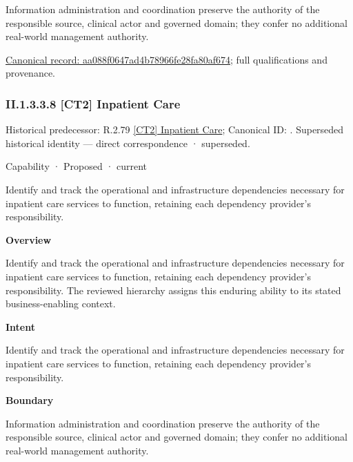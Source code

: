 Information administration and coordination preserve the authority of the responsible source, clinical actor and governed domain; they confer no additional real-world management authority.


{\footnotesize \href{../../../../continuum/strategy/capability/aa088f0647ad4b78966fe28fa80af674.md}{Canonical record: aa088f0647ad4b78966fe28fa80af674}; full qualifications and provenance.}\par
\subsubsection*{II.1.3.3.8 [CT2] Inpatient Care}
\label{navigation:II.1.3.3.8}

{\small Historical predecessor: R.2.79 \hyperref[element:bcc40a14465e48aca42c9505a6853081]{[CT2] Inpatient Care}; Canonical ID: \texttt{}. Superseded historical identity — direct correspondence · superseded.}\par
\label{element:b39fb49c01b545a5b51d3313531efb1b}
{\small Capability · Proposed · current}\par

Identify and track the operational and infrastructure dependencies necessary for inpatient care services to function, retaining each dependency provider's responsibility.



\textbf{Overview}



Identify and track the operational and infrastructure dependencies necessary for inpatient care services to function, retaining each dependency provider's responsibility. The reviewed hierarchy assigns this enduring ability to its stated business-enabling context.



\textbf{Intent}



Identify and track the operational and infrastructure dependencies necessary for inpatient care services to function, retaining each dependency provider's responsibility.



\textbf{Boundary}



Information administration and coordination preserve the authority of the responsible source, clinical actor and governed domain; they confer no additional real-world management authority.


